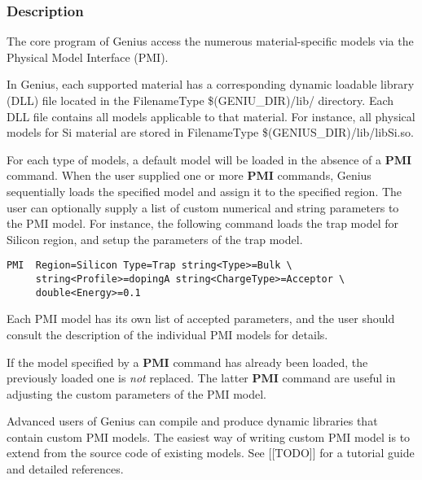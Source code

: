 \documentclass[oneside,12pt]{cgd_book}
\begin{document}
\subsubsection{Description}
The core program of Genius access the numerous material-specific models via the Physical Model Interface
          (PMI).
\par
In Genius, each supported material has a corresponding dynamic loadable library (DLL) file located in
          the  FilenameType \$(GENIU\_DIR)/lib/ directory. Each DLL file contains all models applicable to that
          material. For instance, all physical models for Si material are stored in
 FilenameType \$(GENIUS\_DIR)/lib/libSi.so.
\par
For each type of models, a default model will be loaded in the absence of a
$\mathbf{PMI}$ command. When the user supplied one or more $\mathbf{PMI}$
commands, Genius
          sequentially loads the specified model and assign it to the specified region. The user can optionally supply a
          list of custom numerical and string parameters to the PMI model. For instance, the following command loads the
          trap model for Silicon region, and setup the parameters of the trap model.
\begin{lstlisting}[style=GeniusCode]
PMI  Region=Silicon Type=Trap string<Type>=Bulk \
     string<Profile>=dopingA string<ChargeType>=Acceptor \
     double<Energy>=0.1
\end{lstlisting}
Each PMI model has its own list of accepted parameters, and the user should consult the
          description of the individual PMI models for details.
\par
If the model specified by a $\mathbf{PMI}$ command has already been loaded, the previously
          loaded one is \emph{not} replaced. The latter $\mathbf{PMI}$
command are useful in
          adjusting the custom parameters of the PMI model.
\par
\marginhead{Custom PMI Model}Advanced users of Genius can compile and produce dynamic libraries that
            contain custom PMI models. The easiest way of writing custom PMI model is to extend from the source code of
            existing models. See [[TODO]] for a tutorial guide and detailed references.
\par
\par
\end{document}
